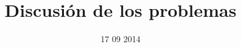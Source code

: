 \documentclass[a4paper,12pt]{book}
\begin{document}
\author{}
\title{Discusión de los problemas}
\date{17 09 2014}

\frontmatter
\maketitle
\tableofcontents

\mainmatter




\backmatter
\end{document}
